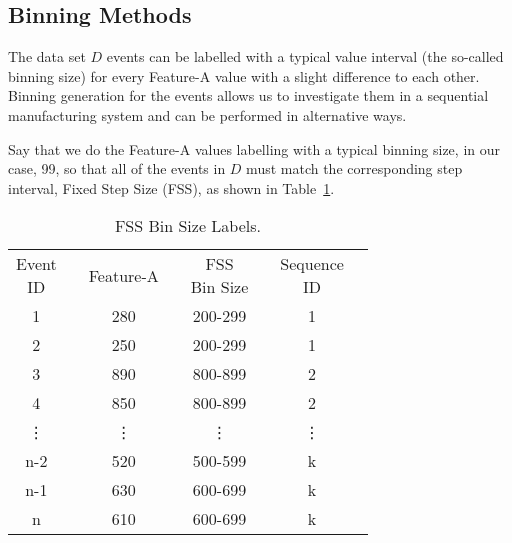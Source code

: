 \subsection*{Binning Methods}
%

The data set $D$ events can be labelled with a typical value interval (the so-called binning size) for every Feature-A value with a slight difference to each other. Binning generation for the events allows us to investigate them in a sequential manufacturing system and can be performed in alternative ways.

Say that we do the Feature-A values labelling with a typical binning size, in our case, 99, so that all of the events in $D$ must match the corresponding step interval, Fixed Step Size (FSS), as shown in Table~\ref{Tab: D-dataset-FSS}. 
\begin{table}[hb!]
	\centering
	\begin{tabular}{|ccccccc|l}
		\cline{1-7}
		\makecell{Event\\ID} 	&& Feature-A    	&& \makecell{FSS\\Bin Size}&& \makecell{Sequence\\ID} &  \\ \cline{1-7}
		1 	      && 280	    && 200-299	&& 1 		   &  \\
		2 		  && 250	    && 200-299	&& 1 		   &  \\
		3 	      && 890	    && 800-899	&& 2 		   &  \\
		4 		  && 850	    && 800-899	&& 2 		   &  \\
		\vdots	  && \vdots  	&& \vdots	&& \vdots 	   &  \\
		n-2 	  && 520	    && 500-599	&& k 		   &  \\
		n-1       && 630	    && 600-699	&& k 		   &  \\
		n 		  && 610	    && 600-699	&& k 		   &  \\ \cline{1-7}
	\end{tabular}
	\caption{FSS Bin Size Labels.}
	\label{Tab: D-dataset-FSS}
\end{table}

